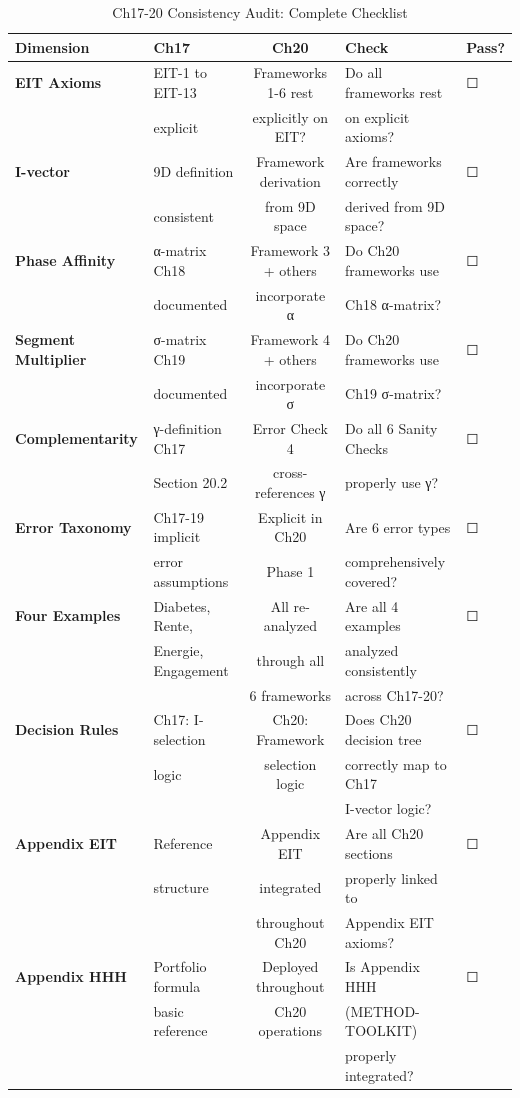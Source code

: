\begin{table}[htbp]
\centering
\caption{Ch17-20 Consistency Audit: Complete Checklist}
\label{tab:20-final-consistency}
\renewcommand{\arraystretch}{1.2}
\footnotesize
\begin{tabular}{@{}llcll@{}}
\toprule
\textbf{Dimension} & \textbf{Ch17} & \textbf{Ch20} & \textbf{Check} & \textbf{Pass?} \\
\midrule
\textbf{EIT Axioms} & EIT-1 to EIT-13 & Frameworks 1-6 rest & Do all frameworks rest & ☐ \\
& explicit & explicitly on EIT? & on explicit axioms? & \\
\midrule
\textbf{I-vector} & 9D definition & Framework derivation & Are frameworks correctly & ☐ \\
& consistent & from 9D space & derived from 9D space? & \\
\midrule
\textbf{Phase Affinity} & α-matrix Ch18 & Framework 3 + others & Do Ch20 frameworks use & ☐ \\
& documented & incorporate α & Ch18 α-matrix? & \\
\midrule
\textbf{Segment Multiplier} & σ-matrix Ch19 & Framework 4 + others & Do Ch20 frameworks use & ☐ \\
& documented & incorporate σ & Ch19 σ-matrix? & \\
\midrule
\textbf{Complementarity} & γ-definition Ch17 & Error Check 4 & Do all 6 Sanity Checks & ☐ \\
& Section 20.2 & cross-references γ & properly use γ? & \\
\midrule
\textbf{Error Taxonomy} & Ch17-19 implicit & Explicit in Ch20 & Are 6 error types & ☐ \\
& error assumptions & Phase 1 & comprehensively covered? & \\
\midrule
\textbf{Four Examples} & Diabetes, Rente, & All re-analyzed & Are all 4 examples & ☐ \\
& Energie, Engagement & through all & analyzed consistently & \\
& & 6 frameworks & across Ch17-20? & \\
\midrule
\textbf{Decision Rules} & Ch17: I-selection & Ch20: Framework & Does Ch20 decision tree & ☐ \\
& logic & selection logic & correctly map to Ch17 & \\
& & & I-vector logic? & \\
\midrule
\textbf{Appendix EIT} & Reference & Appendix EIT & Are all Ch20 sections & ☐ \\
& structure & integrated & properly linked to & \\
& & throughout Ch20 & Appendix EIT axioms? & \\
\midrule
\textbf{Appendix HHH} & Portfolio formula & Deployed throughout & Is Appendix HHH & ☐ \\
& basic reference & Ch20 operations & (METHOD-TOOLKIT) & \\
& & & properly integrated? & \\
\bottomrule
\end{tabular}
\end{table}

